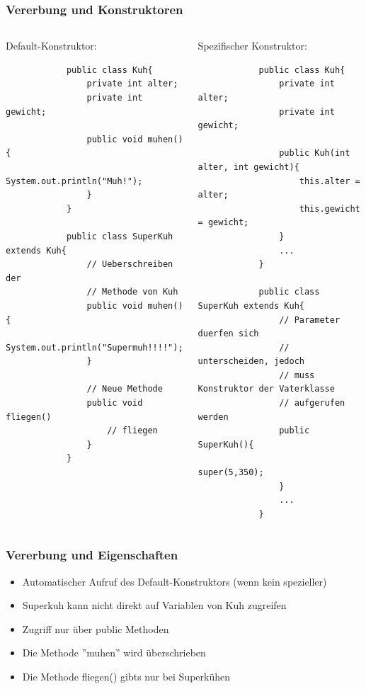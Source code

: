 \begin{frame}[fragile]
	\frametitle{Vererbung und Konstruktoren}
	\begin{columns}
		\begin{column}{0.5\textwidth}
		Default-Konstruktor:
		\begin{lstlisting}
			public class Kuh{
				private int alter;
				private int gewicht;

				public void muhen(){
					System.out.println("Muh!");
				}
			} 
			
			public class SuperKuh extends Kuh{
				// Ueberschreiben der
				// Methode von Kuh
				public void muhen(){
					System.out.println("Supermuh!!!!");
				}
				
				// Neue Methode
				public void fliegen()
					// fliegen
				}
			}
			\end{lstlisting}
		\end{column}
		\begin{column}{0.5\textwidth}
		Spezifischer Konstruktor:
		\begin{lstlisting}
			public class Kuh{
				private int alter;
				private int gewicht;
				
				public Kuh(int alter, int gewicht){
					this.alter = alter;
					this.gewicht = gewicht;
				}
				...
			}
			
			public class SuperKuh extends Kuh{
				// Parameter duerfen sich
				// unterscheiden, jedoch
				// muss Konstruktor der Vaterklasse
				// aufgerufen werden
				public SuperKuh(){
					super(5,350);
				}
				...
			}
			\end{lstlisting}
		\end{column}
	\end{columns}
\end{frame} 

\begin{frame}[fragile]
	\frametitle{Vererbung und Eigenschaften}
		\begin{itemize}
		  \item Automatischer Aufruf des 
		  Default-Konstruktors (wenn kein spezieller)
		  \item Superkuh kann nicht direkt
		  auf Variablen von Kuh zugreifen
		  \item Zugriff nur \"uber public 
		  Methoden
		  \item Die Methode ''muhen'' wird 
		  \"uberschrieben
		  \item Die Methode fliegen() gibts 
		  nur bei Superk\"uhen
		\end{itemize}
\end{frame}


